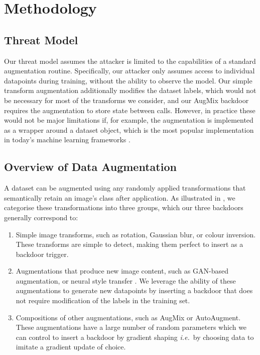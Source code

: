 \section{Methodology}

\subsection{Threat Model}

Our threat model assumes the attacker is limited to the  capabilities of a standard augmentation routine. Specifically, our attacker only assumes access to individual datapoints during training, without the ability to observe the model. Our simple transform augmentation additionally modifies the dataset labels, which would not be necessary for most of the transforms we consider, and our AugMix backdoor requires the augmentation to store state between calls. However, in practice these would not be major limitations if, for example, the augmentation is implemented as a wrapper around a dataset object, which is the most popular implementation in today's machine learning frameworks \citep{paszke2017automatic}.

\subsection{Overview of Data Augmentation}

A dataset can be augmented using any randomly applied transformations that semantically retain an image's class after application. As illustrated in , we categorise these transformations into three groups, which our three backdoors generally correspond to:

\begin{enumerate}
\item Simple image transforms, such as rotation, Gaussian blur, or colour inversion. These transforms are simple to detect, making them perfect to insert as a backdoor trigger.
\item Augmentations that produce new image content, such as GAN-based augmentation, or neural style transfer \citep{nst}. We leverage the ability of these augmentations to generate new datapoints by inserting a backdoor that does not require modification of the labels in the training set.
\item Compositions of other augmentations, such as AugMix or AutoAugment. These augmentations have a large number of random parameters which we can control to insert a backdoor by gradient shaping \textit{i.e.}~by choosing data to imitate a gradient update of choice.
\end{enumerate}

